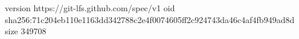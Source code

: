 version https://git-lfs.github.com/spec/v1
oid sha256:71c204eb110e1163dd342788c2e4f0074605ff2c924743da46c4af4fb949ad8d
size 349708
